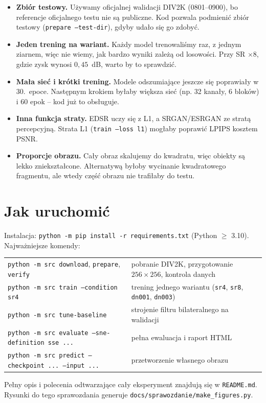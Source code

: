 \documentclass[11pt,a4paper]{article}
\newcommand{\code}[1]{\texttt{\mdseries #1}}
\begin{document}
\begin{itemize}
  \item \textbf{Zbiór testowy.} Używamy oficjalnej walidacji DIV2K (0801--0900), bo referencje oficjalnego
        testu nie są publiczne. Kod pozwala podmienić zbiór testowy (\code{prepare --test-dir}), gdyby udało się
        go zdobyć.
  \item \textbf{Jeden trening na wariant.} Każdy model trenowaliśmy raz, z jednym ziarnem, więc nie wiemy, jak
        bardzo wyniki zależą od losowości. Przy SR $\times8$, gdzie zysk wynosi $0{,}45$~dB, warto by to sprawdzić.
  \item \textbf{Mała sieć i krótki trening.} Modele odszumiające jeszcze się poprawiały w 30.~epoce. Następnym
        krokiem byłaby większa sieć (np. 32 kanały, 6 bloków) i 60 epok -- kod już to obsługuje.
  \item \textbf{Inna funkcja straty.} EDSR uczy się z L1, a SRGAN/ESRGAN ze stratą percepcyjną. Strata L1
        (\code{train --loss l1}) mogłaby poprawić LPIPS kosztem PSNR.
  \item \textbf{Proporcje obrazu.} Cały obraz skalujemy do kwadratu, więc obiekty są lekko zniekształcone.
        Alternatywą byłoby wycinanie kwadratowego fragmentu, ale wtedy część obrazu nie trafiłaby do testu.
\end{itemize}

\section{Jak uruchomić}

Instalacja: \code{python -m pip install -r requirements.txt} (Python $\geq$ 3.10). Najważniejsze komendy:
\begin{center}\small
\begin{tabularx}{\textwidth}{@{}l>{\raggedright\arraybackslash}X@{}}
  \toprule
  \code{python -m src download}, \code{prepare}, \code{verify} & pobranie DIV2K, przygotowanie $256\times256$, kontrola danych \\
  \code{python -m src train --condition sr4} & trening jednego wariantu (\code{sr4}, \code{sr8}, \code{dn001}, \code{dn003}) \\
  \code{python -m src tune-baseline} & strojenie filtru bilateralnego na walidacji \\
  \code{python -m src evaluate --sne-definition sse ...} & pełna ewaluacja i raport HTML \\
  \code{python -m src predict --checkpoint ... --input ...} & przetworzenie własnego obrazu \\
  \bottomrule
\end{tabularx}
\end{center}
Pełny opis i polecenia odtwarzające cały eksperyment znajdują się w \code{README.md}.
Rysunki do tego sprawozdania generuje \code{docs/sprawozdanie/make\_figures.py}.
\end{document}
